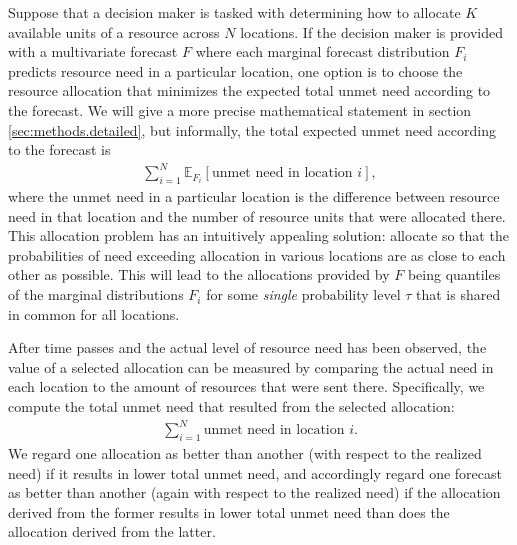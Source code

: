 \documentclass{article}\usepackage[]{graphicx}\usepackage[]{xcolor}
\begin{document}
Suppose that a decision maker is tasked with determining how to allocate $K$ available units of a resource across $N$
locations. If the decision maker is provided with a multivariate forecast $F$ where each marginal forecast distribution
$F_i$ predicts resource need in a particular location, one option is to choose the resource allocation that minimizes
the expected total unmet need according to the forecast. We will give a more precise mathematical statement in section
\ref{sec:methods.detailed}, but informally, the total expected unmet need according to the forecast is
\begin{align}
\sum_{i=1}^N \mathbb{E}_{F_i}[\text{unmet need in location $i$}], \label{eqn:informal_objective}
\end{align}
where the unmet need in a particular location is the difference between resource need in that location and the number of
resource units that were allocated there. This allocation problem has an intuitively appealing solution: allocate so that the
probabilities of need exceeding allocation in various locations are as close to each other as possible. This will lead
to the allocations provided by $F$ being quantiles of the marginal distributions $F_i$ for some \emph{single}
probability level $\tau$ that is shared in common for all locations.

After time passes and the actual level of resource need has been observed, the value of a selected allocation can be
measured by comparing the actual need in each location to the amount of resources that were sent there. Specifically, we
compute the total unmet need that resulted from the selected allocation:
\begin{align}
    \sum_{i=1}^N \text{unmet need in location $i$}. \label{eqn:informal_loss}
\end{align}
We regard one allocation as better than another (with respect to the realized need) if it results in lower total 
unmet need, and accordingly regard one forecast as better than another (again with respect to the realized need)
if the allocation derived from the former results in lower total unmet need than does the allocation derived from the 
latter.
\end{document}
